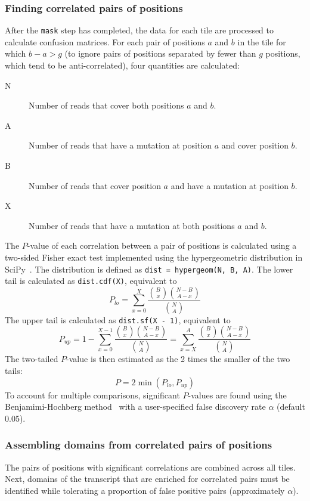 \documentclass[11pt]{article}
\begin{document}
\subsubsection{Finding correlated pairs of positions}

After the \verb|mask| step has completed, the data for each tile are processed to calculate confusion matrices.
For each pair of positions $a$ and $b$ in the tile for which $b - a > g$ (to ignore pairs of positions separated by fewer than $g$ positions, which tend to be anti-correlated), four quantities are calculated:
\begin{description}
    \item[N] Number of reads that cover both positions $a$ and $b$.
    \item[A] Number of reads that have a mutation at position $a$ and cover position $b$.
    \item[B] Number of reads that cover position $a$ and have a mutation at position $b$.
    \item[X] Number of reads that have a mutation at both positions $a$ and $b$.
\end{description}

The $P$-value of each correlation between a pair of positions is calculated using a two-sided Fisher exact test implemented using the hypergeometric distribution in SciPy~\cite{Virtanen2020}.
The distribution is defined as \verb|dist = hypergeom(N, B, A)|.
The lower tail is calculated as \verb|dist.cdf(X)|, equivalent to
$$P_{lo} = \sum_{x=0}^X{\frac{\binom{B}{x} \binom{N - B}{A - x}}{\binom{N}{A}}}$$
The upper tail is calculated as \verb|dist.sf(X - 1)|, equivalent to
$$P_{up} = 1 - \sum_{x=0}^{X - 1}{\frac{\binom{B}{x} \binom{N - B}{A - x}}{\binom{N}{A}}} = \sum_{x=X}^A{\frac{\binom{B}{x} \binom{N - B}{A - x}}{\binom{N}{A}}}$$
The two-tailed $P$-value is then estimated as the 2 times the smaller of the two tails:
$$P = 2\min{(P_{lo}, P_{up})}$$
To account for multiple comparisons, significant $P$-values are found using the Benjamimi-Hochberg method~\cite{Benjamini1995} with a user-specified false discovery rate $\alpha$ (default 0.05).

\subsubsection{Assembling domains from correlated pairs of positions}

The pairs of positions with significant correlations are combined across all tiles.
Next, domains of the transcript that are enriched for correlated pairs must be identified while tolerating a proportion of false positive pairs (approximately $\alpha$).
\end{document}
